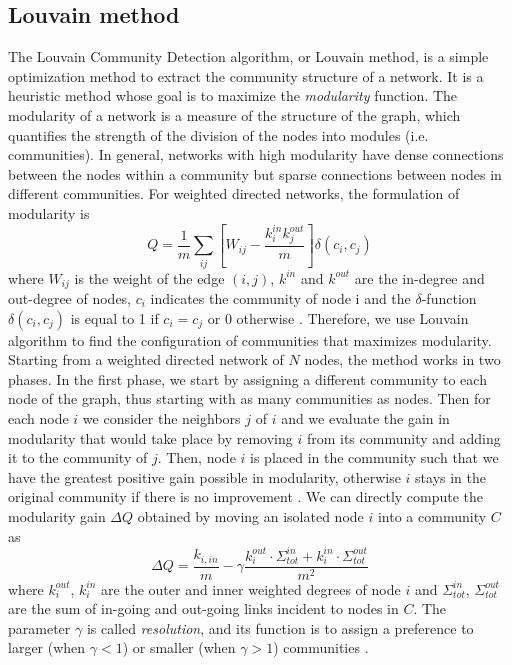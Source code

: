 \subsection{Louvain method}

The Louvain Community Detection algorithm, or Louvain method, is a simple optimization method to extract the community structure of a network. It is a heuristic method whose goal is to maximize the \textit{modularity} function. The modularity of a network is a measure of the structure of the graph, which quantifies the strength of the division of the nodes into modules (i.e. communities). In general, networks with high modularity have dense connections between the nodes within a community but sparse connections between nodes in different communities.
For weighted directed networks, the formulation of modularity is 
\[
    Q = \frac{1}{m} \sum_{ij} \left[ W_{ij} - \frac{k_i^{in}k_j^{out}}{m} \right] \delta(c_i,c_j)
\]
where $W_{ij}$ is the weight of the edge $(i,j)$, $k^{in}$ and $k^{out}$
are the in-degree and out-degree of nodes, $c_i$ indicates the community of node i and the $\delta$-function $\delta(c_i,c_j)$ is equal to 1 if $c_i=c_j$ or $0$ otherwise \cite{leicht2008community}.
Therefore, we use Louvain algorithm to find the configuration of communities that maximizes modularity. Starting from a weighted directed network of $N$ nodes, the method works in two phases. 
In the first phase, we start by assigning a different community to each node of the graph, thus starting with as many communities as nodes. Then for each node $i$ we consider the neighbors $j$ of $i$ and we evaluate the gain in modularity that would take place by removing $i$ from its community and adding it to the community of $j$. Then, node $i$ is placed in the community such that we have the greatest positive gain possible in modularity, otherwise $i$ stays in the original community if there is no improvement \cite{blondel2008louvain}. We can directly compute the modularity gain $\Delta Q$ obtained by moving an isolated node \(i\) into a community \(C\) as
\[
    \Delta Q = \frac{k_{i,in}}{m} - \gamma\frac{k_i^{out} \cdot\Sigma_{tot}^{in} + k_i^{in} \cdot \Sigma_{tot}^{out}}{m^2}
\]
where \(k_i^{out}\), \(k_i^{in}\) are the outer and inner weighted degrees of node \(i\) and \(\Sigma_{tot}^{in}\), \(\Sigma_{tot}^{out}\) are the sum of in-going and out-going links incident to nodes in \(C\).
The parameter $\gamma$ is called \textit{resolution}, and its function is to assign a preference to larger (when $\gamma < 1$) or smaller (when $\gamma > 1$) communities \cite{hagberg2008networkx}.
